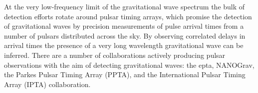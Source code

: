   At the very low-frequency limit of the gravitational wave spectrum
  the bulk of detection efforts rotate around pulsar timing arrays,
  which promise the detection of gravitational waves by precision
  measurements of pulse arrival times from a number of pulsars
  distributed across the sky. By observing correlated
  delays\cite{1983ApJ...265L..39H} in arrival times the presence of a
  very long wavelength gravitational wave can be inferred. There are a
  number of collaborations actively producing pulsar observations with
  the aim of detecting gravitational waves: the \gls{epta}\cite{2013CQGra..30v4009K},
  NANOGrav\cite{2009arXiv0909.1058J}, the Parkes Pulsar Timing Array
  (PPTA)\cite{2013PASA...30...17M}, and the International Pulsar
  Timing Array (IPTA) collaboration\cite{2013CQGra..30v4010M}. %

